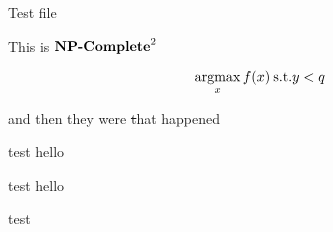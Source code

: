\documentclass[12pt]{article}
\begin{document}
Test file

This is \({{\textbf{NP-Complete}}}^2\)


\[
  \operatorname*{argmax}_x f(x) \: \text{s.t.} y < q
\]



and then they were \st that happened


\begin{problem}
  test hello
\end{problem}


\begin{solution*}[annotate]
  test hello
\end{solution*}

\begin{lemma}
  test
\end{lemma}
\end{document}
